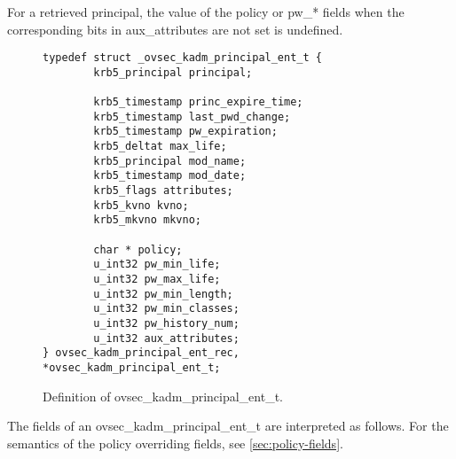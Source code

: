 For a retrieved principal, the value of the policy or pw_* fields when
the corresponding bits in aux_attributes are not set is undefined.

\begin{figure}[htbp]
\begin{verbatim}
typedef struct _ovsec_kadm_principal_ent_t {
        krb5_principal principal;

        krb5_timestamp princ_expire_time;
        krb5_timestamp last_pwd_change;
        krb5_timestamp pw_expiration;
        krb5_deltat max_life;
        krb5_principal mod_name;
        krb5_timestamp mod_date;
        krb5_flags attributes;
        krb5_kvno kvno;
        krb5_mkvno mkvno;

        char * policy;
        u_int32 pw_min_life;
        u_int32 pw_max_life;
        u_int32 pw_min_length;
        u_int32 pw_min_classes;
        u_int32 pw_history_num;
        u_int32 aux_attributes;
} ovsec_kadm_principal_ent_rec, *ovsec_kadm_principal_ent_t;
\end{verbatim}
\caption{Definition of ovsec_kadm_principal_ent_t.}
\label{fig:princ-t}
\end{figure}

The fields of an ovsec_kadm_principal_ent_t are interpreted as
follows.  For the semantics of the policy overriding fields, see
\ref{sec:policy-fields}.

